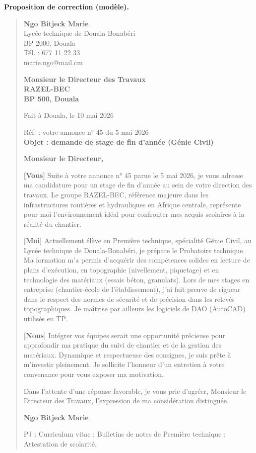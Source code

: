\documentclass[11pt]{article}
\begin{document}
\begin{corrige}
\textbf{Proposition de correction (modèle).}
\begin{quote}
\textbf{Ngo Bitjeck Marie}\\
Lycée technique de Douala-Bonabéri\\
BP 2000, Douala\\
Tél. : 677 11 22 33\\
marie.ngo@mail.cm

\hfill \textbf{Monsieur le Directeur des Travaux}\\
\hfill \textbf{RAZEL-BEC}\\
\hfill \textbf{BP 500, Douala}

\hfill Fait à Douala, le 10 mai 2026

Réf. : votre annonce n° 45 du 5 mai 2026\\
\textbf{Objet : demande de stage de fin d'année (Génie Civil)}

\textbf{Monsieur le Directeur,}

\textbf{[Vous]} Suite à votre annonce n° 45 parue le 5 mai 2026, je vous adresse ma candidature pour un stage de fin d'année au sein de votre direction des travaux. Le groupe RAZEL-BEC, référence majeure dans les infrastructures routières et hydrauliques en Afrique centrale, représente pour moi l'environnement idéal pour confronter mes acquis scolaires à la réalité du chantier.

\textbf{[Moi]} Actuellement élève en Première technique, spécialité Génie Civil, au Lycée technique de Douala-Bonabéri, je prépare le Probatoire technique. Ma formation m'a permis d'acquérir des compétences solides en lecture de plans d'exécution, en topographie (nivellement, piquetage) et en technologie des matériaux (essais béton, granulats). Lors de mes stages en entreprise (chantier-école de l'établissement), j'ai fait preuve de rigueur dans le respect des normes de sécurité et de précision dans les relevés topographiques. Je maîtrise par ailleurs les logiciels de DAO (AutoCAD) utilisés en TP.

\textbf{[Nous]} Intégrer vos équipes serait une opportunité précieuse pour approfondir ma pratique du suivi de chantier et de la gestion des matériaux. Dynamique et respectueuse des consignes, je suis prête à m'investir pleinement. Je sollicite l'honneur d'un entretien à votre convenance pour vous exposer ma motivation.

Dans l'attente d'une réponse favorable, je vous prie d'agréer, Monsieur le Directeur des Travaux, l'expression de ma considération distinguée.

\hfill \textbf{Ngo Bitjeck Marie}

PJ : Curriculum vitae ; Bulletins de notes de Première technique ; Attestation de scolarité.
\end{quote}
\end{corrige}
\end{document}
